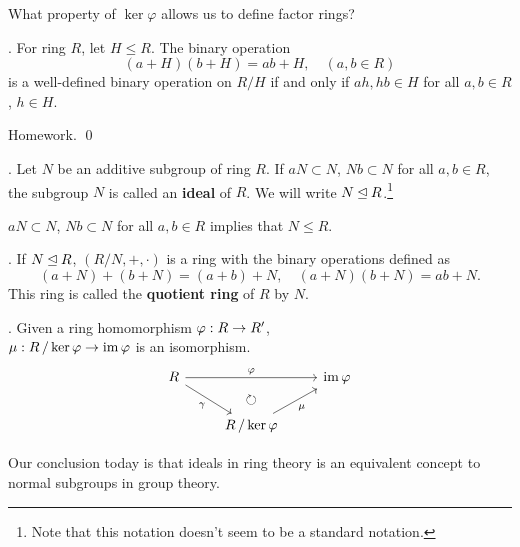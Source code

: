 What property of \(\ker \varphi\) allows us to define factor rings?

\thm. For ring \(R\), let \(H \leq R\). The binary operation
\[
    (a + H)(b + H) = ab + H, \quad (a, b \in R)
\]
is a well-defined binary operation on \(R/H\) if and only if \(ah, hb \in H\) for all \(a, b \in R\), \(h \in H\).

\pf Homework. \qed

\pagebreak

.  Let \(N\) be an additive subgroup of ring \(R\). If \(aN \subset N\), \(Nb \subset N\) for all \(a, b \in R\), the subgroup \(N\) is called an \textbf{ideal} of \(R\). We will write \(N \unlhd R\).\footnote{Note that this notation doesn't seem to be a standard notation.}

\rmk \(aN \subset N\), \(Nb \subset N\) for all \(a, b \in R\) implies that \(N \leq R\).

.  If \(N \unlhd R\), \((R / N, +, \cdot)\) is a ring with the binary operations defined as
\[
    (a + N) + (b + N) = (a + b) + N, \quad (a + N)(b + N) = ab + N.
\]
This ring is called the \textbf{quotient ring} of \(R\) by \(N\).

\thm.  Given a ring homomorphism \(\varphi : R \rightarrow R'\),\\
\(\mu : R \operatorname{/} {\ker\varphi} \rightarrow \operatorname{im} \varphi\) is an isomorphism.
\[
    \begin{tikzcd}
        R \arrow{rr}{\varphi} \arrow[swap]{dr}{\gamma} & \arrow[d, phantom, "\circlearrowright"]& \im \varphi \\
        & R \quotient \ker\varphi \arrow[swap]{ur}{\mu} &
    \end{tikzcd}
\]

Our conclusion today is that ideals in ring theory is an equivalent concept to normal subgroups in group theory.

\pagebreak
